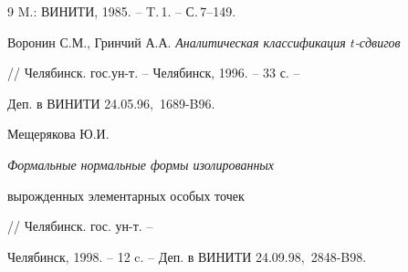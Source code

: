 \begin{thebibliography}{9}
M.: ВИНИТИ, 1985. -- T.\,1. -- С.\,7--149.







Воронин С.М., Гринчий А.А. {\em Аналитическая классификация $t$-сдвигов}


// Челябинск. гос.\linebreak ун-т. -- Челябинск, 1996. -- 33 с. --


Деп. в ВИНИТИ 24.05.96, \No\,1689-B96. 







Мещерякова Ю.И. {\em Формальные нормальные формы изолированных


вырожденных элементарных особых точек} // Челябинск. гос. ун-т. --


Челябинск, 1998. -- 12 c. -- Деп. в ВИНИТИ 24.09.98, \No\,2848-B98. 





\end{thebibliography}





\vskip 2cm












\label{end}





